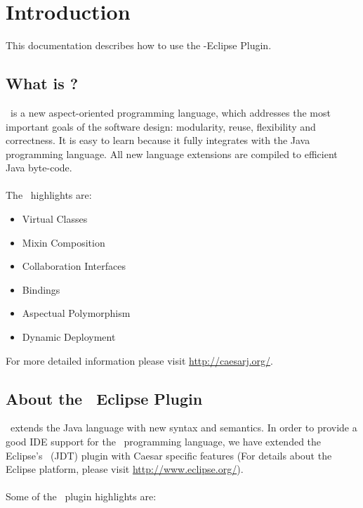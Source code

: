 \section{Introduction}
This documentation describes how to use the \caesarj -Eclipse Plugin.


\subsection{What is \caesarj{}?}
\caesar ~is a new aspect-oriented programming language, which addresses the most important goals of the software design: modularity, reuse, flexibility and correctness. It is easy to learn because it fully integrates with the Java programming language. All new language extensions are compiled to efficient Java byte-code.\\\\
The \caesar ~highlights are:
\begin{itemize}
	\item Virtual Classes
	\item Mixin Composition
	\item Collaboration Interfaces	
	\item Bindings
	\item Aspectual Polymorphism	
	\item Dynamic Deployment		
\end{itemize}

For more detailed information please visit \href{http://caesarj.org/}{http://caesarj.org/}.

\subsection{About the \caesarj ~Eclipse Plugin}
\caesarj ~extends the Java language with new syntax and semantics. %
In order to provide a good IDE support for the \caesarj ~programming language, we have extended the Eclipse's \jdt ~(JDT) plugin with Caesar specific features (For details about the Eclipse platform, please visit \href{http://www.eclipse.org/}{http://www.eclipse.org/}).\\\\
Some of the \caesar{}~plugin highlights are:

